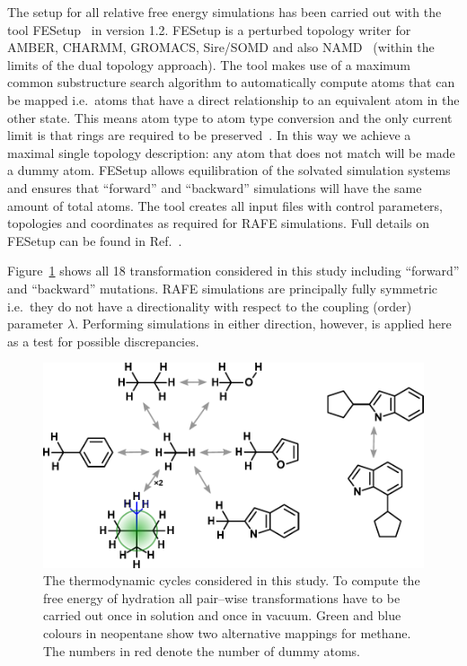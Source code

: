 \documentclass[journal=jctcce,manuscript=article]{achemso}
\begin{document}
The setup for all relative free energy simulations has been carried
out with the tool FESetup~\cite{loeffler_fesetup:_2015} in version
1.2.  FESetup is a perturbed topology writer for AMBER, CHARMM,
GROMACS, Sire/SOMD and also NAMD~\cite{JCC:JCC20289} (within the
limits of the dual topology approach).  The tool makes use of a
maximum common substructure search algorithm to automatically compute
atoms that can be mapped i.e.\ atoms that have a direct relationship
to an equivalent atom in the other state.  This means atom type to
atom type conversion and the only current limit is that rings are
required to be preserved~\cite{doi:10.1021/acs.jcim.5b00057}.  In this
way we achieve a maximal single topology description: any atom that
does not match will be made a dummy atom.  FESetup allows
equilibration of the solvated simulation systems and ensures that
``forward'' and ``backward'' simulations will have the same amount of
total atoms.  The tool creates all input files with control
parameters, topologies and coordinates as required for RAFE
simulations.  Full details on FESetup can be found in
Ref.~.

Figure~\ref{fig:cycles} shows all 18 transformation considered in this
study including ``forward'' and ``backward'' mutations.  RAFE
simulations are principally fully symmetric i.e.\ they do not have a
directionality with respect to the coupling (order) parameter
$\lambda$.  Performing simulations in either direction, however, is
applied here as a test for possible discrepancies.

\begin{figure}[ht]
  \includegraphics[scale=1.0]{figures/cycles.pdf}
  \caption{The thermodynamic cycles considered in this study.  To
    compute the free energy of hydration all pair--wise
    transformations have to be carried out once in solution and once
    in vacuum.  Green and blue colours in neopentane show two
    alternative mappings for methane.  The numbers in red denote the
    number of dummy atoms.}
  \label{fig:cycles}
\end{figure}
\end{document}
